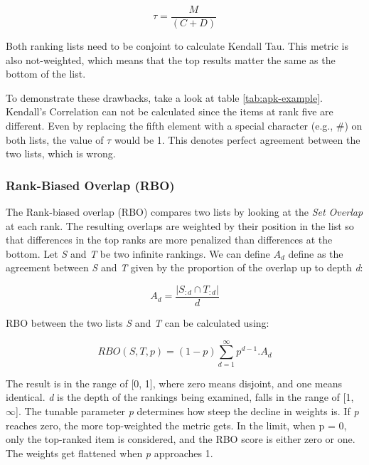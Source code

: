 \begin{equation}
    \tau = \frac{M}{(C+D)}
    \label{eq:kendall-tau}
\end{equation}

Both ranking lists need to be conjoint to calculate Kendall Tau. This metric is also not-weighted, which means that the top results matter the same as the bottom of the list.

To demonstrate these drawbacks, take a look at table \ref{tab:apk-example}. Kendall's Correlation can not be calculated since the items at rank five are different. Even by replacing the fifth element with a special character (e.g., \#) on both lists, the value of $\tau$ would be 1. This denotes perfect agreement between the two lists, which is wrong.

\subsubsection{Rank-Biased Overlap (RBO)}
The Rank-biased overlap (RBO) \cite{webber2010similarity} compares two lists by looking at the \emph{Set Overlap} at each rank. The resulting overlaps are weighted by their position in the list so that differences in the top ranks are more penalized than differences at the bottom. Let \emph{S} and \emph{T} be two infinite rankings. We can define $A_{d}$ define as the agreement between \emph{S} and \emph{T} given by the proportion of the overlap up to depth \emph{d}:

\begin{equation}
	A_{d} = \frac{|S_{:d} \cap T_{:d}|}{d}
	\label{eq:a-d}
\end{equation}


RBO between the two lists \emph{S} and \emph{T} can be calculated using:

\begin{equation}
	RBO(S,T,p) = (1-p)\sum_{d=1}^{\infty}p^{d-1}.A_{d}
	\label{eq:rbo}
\end{equation}


The result is in the range of [0, 1], where zero means disjoint, and one means identical. \emph{d} is the depth of the rankings being examined, falls in the range of [1, $\infty$]. The tunable parameter \emph{p} determines how steep the decline in weights is. If \emph{p} reaches zero, the more top-weighted the metric gets. In the limit, when p = 0, only the top-ranked item is considered, and the RBO score is either zero or one. The weights get flattened when \emph{p} approaches 1.


